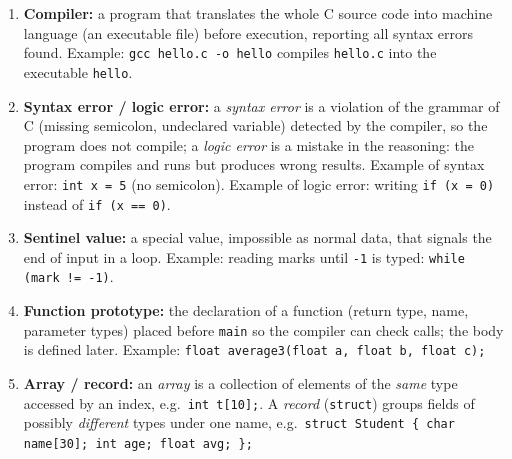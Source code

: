 \documentclass[11pt]{article}
\begin{document}
\begin{corrige}
\begin{enumerate}
\item \textbf{Compiler:} a program that translates the whole C source code into machine language (an executable file) before execution, reporting all syntax errors found. Example: \texttt{gcc hello.c -o hello} compiles \texttt{hello.c} into the executable \texttt{hello}.
\item \textbf{Syntax error / logic error:} a \emph{syntax error} is a violation of the grammar of C (missing semicolon, undeclared variable) detected by the compiler, so the program does not compile; a \emph{logic error} is a mistake in the reasoning: the program compiles and runs but produces wrong results. Example of syntax error: \texttt{int x = 5} (no semicolon). Example of logic error: writing \texttt{if (x = 0)} instead of \texttt{if (x == 0)}.
\item \textbf{Sentinel value:} a special value, impossible as normal data, that signals the end of input in a loop. Example: reading marks until \texttt{-1} is typed: \texttt{while (mark != -1)}.
\item \textbf{Function prototype:} the declaration of a function (return type, name, parameter types) placed before \texttt{main} so the compiler can check calls; the body is defined later. Example: \texttt{float average3(float a, float b, float c);}
\item \textbf{Array / record:} an \emph{array} is a collection of elements of the \emph{same} type accessed by an index, e.g.\ \texttt{int t[10];}. A \emph{record} (\texttt{struct}) groups fields of possibly \emph{different} types under one name, e.g.\ \texttt{struct Student \{ char name[30]; int age; float avg; \};}
\end{enumerate}
\end{corrige}
\end{document}
